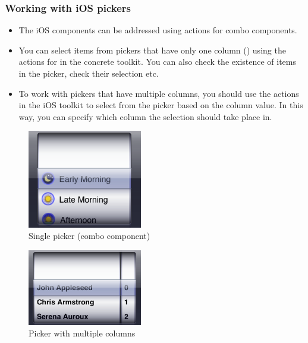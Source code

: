 \subsubsection{Working with iOS pickers}
\begin{itemize}
\item The iOS components  can be addressed using actions for combo components. 
\item You can select items from pickers that have only one column () using the actions for  in the concrete toolkit. You can also check the existence of items in the picker, check their selection etc.
\item To work with pickers that have multiple columns, you should use the actions in the iOS toolkit to select from the picker based on the column value. In this way, you can specify which column the selection should take place in.
\end{itemize}

\begin{figure}[h]
\begin{center}
\includegraphics[width=5cm]{Toolkit/iOS/PS/SinglePicker}
\caption{Single picker (combo component)}
\label{SinglePicker}
\end{center}
\end{figure}

\begin{figure}[h]
\begin{center}
\includegraphics[width=5cm]{Toolkit/iOS/PS/MultiPicker}
\caption{Picker with multiple columns}
\label{MultiPicker}
\end{center}
\end{figure}

